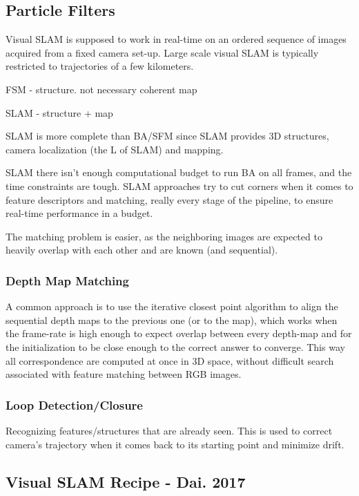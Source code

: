 \subsection{Particle Filters}

Visual SLAM is supposed to work in real-time on an ordered sequence of images acquired from a fixed camera set-up. Large scale visual SLAM is typically restricted to trajectories of a few kilometers.

FSM - structure. not necessary coherent map

SLAM - structure + map

SLAM is more complete than BA/SFM since SLAM provides 3D structures, camera localization (the L of SLAM) and mapping.

SLAM there isn’t enough computational budget to run BA on all frames, and the time constraints are tough. SLAM approaches try to cut corners when it comes to feature descriptors and matching, really every stage of the pipeline, to ensure real-time performance in a budget. 

The matching problem is easier, as the  neighboring images are expected to heavily overlap with each other and are known (and sequential).

\subsubsection{Depth Map Matching}

A common approach is to use the iterative closest point algorithm to align the sequential depth maps to the previous one (or to the map), which works when the frame-rate is high enough to expect overlap between every depth-map and for the initialization to be close enough to the correct answer to converge. This way all correspondence are computed at once in 3D space, without difficult search associated with feature matching between RGB images.

\subsubsection{Loop Detection/Closure}

Recognizing features/structures that are already seen. This is used to correct camera's trajectory when it comes back to its starting point and minimize drift.

\subsection{Visual SLAM Recipe - Dai. 2017}


